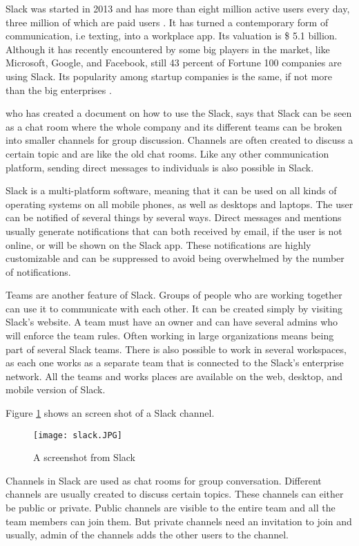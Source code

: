 Slack was started in 2013 and has more than eight million active users every day, three million of which are paid users \citep{Lynley2018}. It has turned a contemporary form of communication, i.e texting, into a workplace app. Its valuation is \$ 5.1 billion. Although it has recently encountered by some big players in the market, like Microsoft, Google, and Facebook, still 43 percent of Fortune 100 companies are using Slack. Its popularity among startup companies is the same, if not more than the big enterprises \citep{Rodriguez2018}.

\citet{Williams2015a} who has created a document on how to use the Slack, says that Slack can be seen as a chat room where the whole company and its different teams can be broken into smaller channels for group discussion. Channels are often created to discuss a certain topic and are like the old chat rooms. Like any other communication platform, sending direct messages to individuals is also possible in Slack.

Slack is a multi-platform software, meaning that it can be used on all kinds of operating systems on all mobile phones, as well as desktops and laptops. The user can be notified of several things by several ways. Direct messages and mentions usually generate notifications that can both received by email, if the user is not online, or will be shown on the Slack app. These notifications are highly customizable and can be suppressed to avoid being overwhelmed by the number of notifications. 

Teams are another feature of Slack. Groups of people who are working together can use it to communicate with each other. It can be created simply by visiting Slack's website. A team must have an owner and can have several admins who will enforce the team rules. Often working in large organizations means being part of several Slack teams. There is also possible to work in several workspaces, as each one works as a separate team that is connected to the Slack's enterprise network.  All the teams and works places are available on the web, desktop, and mobile version of Slack.

Figure \ref{fig:slack} shows an screen shot of a Slack channel.
\begin{figure}[hbt!]
\centering
\texttt{[image: slack.JPG]}
\caption{A screenshot from Slack}\label{fig:slack}
\end{figure}


Channels in Slack are used as chat rooms for group conversation. Different channels are usually created to discuss certain topics. These channels can either be public or private. Public channels are visible to the entire team and all the team members can join them. But private channels need an invitation to join and usually, admin of the channels adds the other users to the channel.
 
